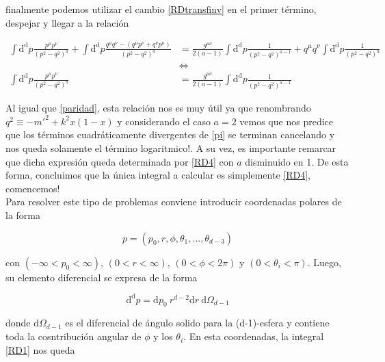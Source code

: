 \documentclass{article}
\numberwithin{equation}{section}
\begin{document}
finalmente podemos utilizar el cambio \ref{RDtransfinv} en el primer término, despejar y llegar a la relación

\begin{equation}\label{picancel}
\begin{aligned}
\int\mathrm{d^d}p \frac{p^{\mu}p^{\nu}}{\left(p^2 -q^2 \right)^a} + \int\mathrm{d^d}p \frac{q^{\mu}q^{\nu} -\left(q^{\mu}p^{\nu} + q^{\nu}p^{\mu}\right)}{\left(p^2 -q^2\right)^a} &= \frac{g^{\mu\nu}}{2(a-1)}\int\mathrm{d^d}p \frac{1}{\left(p^2 -q^2\right)^{a-1}} + q^{\mu}q^{\nu}\int\mathrm{d^d}p \frac{1}{\left(p^2 -q^2\right)^a}\\
& \iff\\
\int\mathrm{d^d}p \frac{p^{\mu}p^{\nu}}{\left(p^2 -q^2 \right)^a} &= \frac{g^{\mu\nu}}{2(a-1)}\int\mathrm{d^d}p \frac{1}{\left(p^2 -q^2\right)^{a-1}}
\end{aligned}
\end{equation}

Al igual que \ref{paridad}, esta relación nos es muy útil ya que renombrando $ q^2 \equiv -m'^2 + k^2x(1-x) $ y considerando el caso $ a=2 $ vemos que nos predice que los términos cuadráticamente divergentes de \ref{pi} se terminan cancelando y nos queda solamente el término logaritmico!. A su vez, es importante remarcar que dicha expresión queda determinada por \ref{RD4} con $ a $ disminuido en 1. De esta forma, concluimos que la única integral a calcular es simplemente \ref{RD4}, comencemos!\\

Para resolver este tipo de problemas conviene introducir coordenadas polares de la forma

\begin{equation}\label{key}
p = \left(p_0,r,\phi,\theta_1,...,\theta_{d-3}\right)
\end{equation}

con $ \left(-\infty < p_0 < \infty\right)  $, $ \left(0 < r < \infty\right)  $, $ \left(0 < \phi < 2\pi\right)  $ y $ \left(0 < \theta_i < \pi\right)  $. Luego, su elemento diferencial se expresa de la forma

\begin{equation}\label{key}
\mathrm{d^d}p=\mathrm{d}p_0 \ r^{d-2} \mathrm{d}r \ \mathrm{d} \Omega_{d-1}
\end{equation}

donde $ \mathrm{d} \Omega_{d-1} $ es el diferencial de ángulo solido para la (d-1)-esfera y contiene toda la cosntribución angular de $ \phi $ y los $ \theta_i $. En esta coordenadas, la integral \ref{RD1} nos queda
\end{document}
